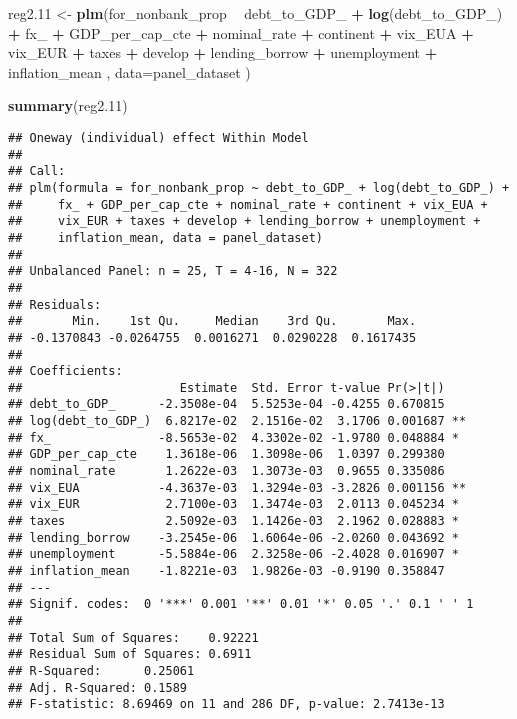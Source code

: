 \documentclass[]{article}
\newenvironment{Shaded}{\begin{snugshade}}{\end{snugshade}}
\newcommand{\KeywordTok}[1]{\textcolor[rgb]{0.13,0.29,0.53}{\textbf{#1}}}
\newcommand{\DataTypeTok}[1]{\textcolor[rgb]{0.13,0.29,0.53}{#1}}
\newcommand{\DecValTok}[1]{\textcolor[rgb]{0.00,0.00,0.81}{#1}}
\newcommand{\StringTok}[1]{\textcolor[rgb]{0.31,0.60,0.02}{#1}}
\newcommand{\OperatorTok}[1]{\textcolor[rgb]{0.81,0.36,0.00}{\textbf{#1}}}
\newcommand{\NormalTok}[1]{#1}
\begin{document}
\begin{Shaded}
\begin{Highlighting}[]
\NormalTok{reg2.}\DecValTok{11}\NormalTok{ <-}\StringTok{ }\KeywordTok{plm}\NormalTok{(for_nonbank_prop }\OperatorTok{~}\StringTok{  }\NormalTok{debt_to_GDP_ }\OperatorTok{+}\StringTok{ }\KeywordTok{log}\NormalTok{(debt_to_GDP_) }\OperatorTok{+}\StringTok{ }\NormalTok{fx_ }\OperatorTok{+}\StringTok{ }\NormalTok{GDP_per_cap_cte }\OperatorTok{+}\StringTok{  }\NormalTok{nominal_rate }\OperatorTok{+}\StringTok{ }\NormalTok{continent }\OperatorTok{+}\StringTok{ }\NormalTok{vix_EUA }\OperatorTok{+}\StringTok{ }\NormalTok{vix_EUR }\OperatorTok{+}\StringTok{ }\NormalTok{taxes }\OperatorTok{+}\StringTok{ }\NormalTok{develop  }\OperatorTok{+}\StringTok{ }\NormalTok{lending_borrow }\OperatorTok{+}\StringTok{ }\NormalTok{unemployment }\OperatorTok{+}\StringTok{ }\NormalTok{inflation_mean , }\DataTypeTok{data=}\NormalTok{panel_dataset  )}

\KeywordTok{summary}\NormalTok{(reg2.}\DecValTok{11}\NormalTok{)}
\end{Highlighting}
\end{Shaded}

\begin{verbatim}
## Oneway (individual) effect Within Model
## 
## Call:
## plm(formula = for_nonbank_prop ~ debt_to_GDP_ + log(debt_to_GDP_) + 
##     fx_ + GDP_per_cap_cte + nominal_rate + continent + vix_EUA + 
##     vix_EUR + taxes + develop + lending_borrow + unemployment + 
##     inflation_mean, data = panel_dataset)
## 
## Unbalanced Panel: n = 25, T = 4-16, N = 322
## 
## Residuals:
##       Min.    1st Qu.     Median    3rd Qu.       Max. 
## -0.1370843 -0.0264755  0.0016271  0.0290228  0.1617435 
## 
## Coefficients:
##                      Estimate  Std. Error t-value Pr(>|t|)   
## debt_to_GDP_      -2.3508e-04  5.5253e-04 -0.4255 0.670815   
## log(debt_to_GDP_)  6.8217e-02  2.1516e-02  3.1706 0.001687 **
## fx_               -8.5653e-02  4.3302e-02 -1.9780 0.048884 * 
## GDP_per_cap_cte    1.3618e-06  1.3098e-06  1.0397 0.299380   
## nominal_rate       1.2622e-03  1.3073e-03  0.9655 0.335086   
## vix_EUA           -4.3637e-03  1.3294e-03 -3.2826 0.001156 **
## vix_EUR            2.7100e-03  1.3474e-03  2.0113 0.045234 * 
## taxes              2.5092e-03  1.1426e-03  2.1962 0.028883 * 
## lending_borrow    -3.2545e-06  1.6064e-06 -2.0260 0.043692 * 
## unemployment      -5.5884e-06  2.3258e-06 -2.4028 0.016907 * 
## inflation_mean    -1.8221e-03  1.9826e-03 -0.9190 0.358847   
## ---
## Signif. codes:  0 '***' 0.001 '**' 0.01 '*' 0.05 '.' 0.1 ' ' 1
## 
## Total Sum of Squares:    0.92221
## Residual Sum of Squares: 0.6911
## R-Squared:      0.25061
## Adj. R-Squared: 0.1589
## F-statistic: 8.69469 on 11 and 286 DF, p-value: 2.7413e-13
\end{verbatim}
\end{document}
